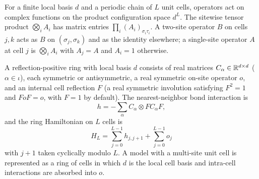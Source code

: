 \begin{definition}
  \label{def:ring-operators}
  \leanok
  For a finite local basis \(d\) and a periodic chain of \(L\) unit cells, operators act on complex
  functions on the product configuration space \(d^L\). The sitewise tensor product
  \(\bigotimes_i A_i\) has matrix entries \(\prod_i (A_i)_{\sigma_i \tau_i}\). A two-site operator
  \(B\) on cells \(j, k\) acts as \(B\) on \((\sigma_j, \sigma_k)\) and as the identity elsewhere;
  a single-site operator \(A\) at cell \(j\) is \(\bigotimes_i A_i\) with \(A_j = A\) and
  \(A_i = 1\) otherwise.
\end{definition}

\begin{definition}
  \label{def:rpring}
  \leanok
  A reflection-positive ring with local basis \(d\) consists of real matrices
  \(C_\alpha \in \mathbb{R}^{d \times d}\) (\(\alpha \in \iota\)), each symmetric or antisymmetric, a real
  symmetric on-site operator \(o\), and an internal cell reflection \(F\) (a real symmetric
  involution satisfying \(F^2 = 1\) and \(F o F = o\), with \(F = 1\) by default). The
  nearest-neighbor bond interaction is
  \begin{equation}
    \label{eq:rp-bond}
    h = -\sum_\alpha C_\alpha \otimes F C_\alpha F,
  \end{equation}
  and the ring Hamiltonian on \(L\) cells is
  \begin{equation}
    \label{eq:rp-hamiltonian}
    H_L = \sum_{j=0}^{L-1} h_{j, j+1} + \sum_{j=0}^{L-1} o_j
  \end{equation}
  with \(j + 1\) taken cyclically modulo \(L\). A model with a multi-site unit cell is represented
  as a ring of cells in which \(d\) is the local cell basis and intra-cell interactions are
  absorbed into \(o\).
\end{definition}

